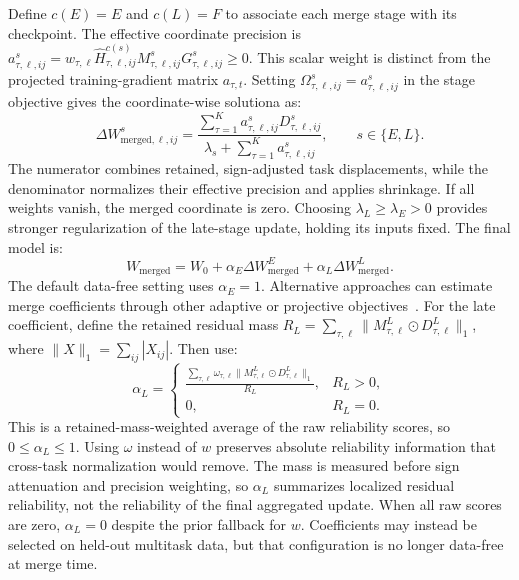 \documentclass[fleqn,10pt]{wlscirep}
\begin{document}
Define $c(E)=E$ and $c(L)=F$ to associate each merge stage with its checkpoint. The effective coordinate precision is $a_{\tau,\ell,ij}^{s}=w_{\tau,\ell} \widehat H_{\tau,\ell,ij}^{c(s)} M_{\tau,\ell,ij}^{s}G_{\tau,\ell,ij}^{s}\geq0$. This scalar weight is distinct from the projected training-gradient matrix $a_{\tau,t}$. Setting $\Omega_{\tau,\ell,ij}^{s}=a_{\tau,\ell,ij}^{s}$ in the stage objective gives the coordinate-wise solutiona as:
\begin{equation}
\Delta W_{\mathrm{merged},\ell,ij}^{s}
=\frac{\sum_{\tau=1}^{K}a_{\tau,\ell,ij}^{s}D_{\tau,\ell,ij}^{s}}
{\lambda_s+\sum_{\tau=1}^{K}a_{\tau,\ell,ij}^{s}},
\qquad s\in\{E,L\}.
\label{eq:early_curvature_aggregation}
\end{equation}
The numerator combines retained, sign-adjusted task displacements, while the denominator normalizes their effective precision and applies shrinkage. If all weights vanish, the merged coordinate is zero. Choosing $\lambda_L\geq\lambda_E>0$ provides stronger regularization of the late-stage update, holding its inputs fixed. The final model is:
\begin{equation}
W_{\mathrm{merged}}
=W_0+\alpha_E\Delta W_{\mathrm{merged}}^{E}
 +\alpha_L\Delta W_{\mathrm{merged}}^{L}.
\label{eq:final_merged_model}
\end{equation}
The default data-free setting uses $\alpha_E=1$. Alternative approaches can estimate merge coefficients through other adaptive or projective objectives~\cite{adamerging2024,apgdmerging2025}. For the late coefficient, define the retained residual mass $R_L=\sum_{\tau,\ell}\|M_{\tau,\ell}^{L}\odot D_{\tau,\ell}^{L}\|_1$, where $\|X\|_1=\sum_{ij}|X_{ij}|$. Then use:
\begin{equation}
\alpha_L
=\begin{cases}
\displaystyle
\frac{\sum_{\tau,\ell}\omega_{\tau,\ell}
\|M_{\tau,\ell}^{L}\odot D_{\tau,\ell}^{L}\|_1}{R_L},
&R_L>0,\\[6pt]
0,&R_L=0.
\end{cases}
\label{eq:data_free_late_coefficient}
\end{equation}
This is a retained-mass-weighted average of the raw reliability scores, so $0\leq\alpha_L\leq1$. Using $\omega$ instead of $w$ preserves absolute reliability information that cross-task normalization would remove. The mass is measured before sign attenuation and precision weighting, so $\alpha_L$ summarizes localized residual reliability, not the reliability of the final aggregated update. When all raw scores are zero, $\alpha_L=0$ despite the prior fallback for $w$. Coefficients may instead be selected on held-out multitask data, but that configuration is no longer data-free at merge time.
\end{document}
